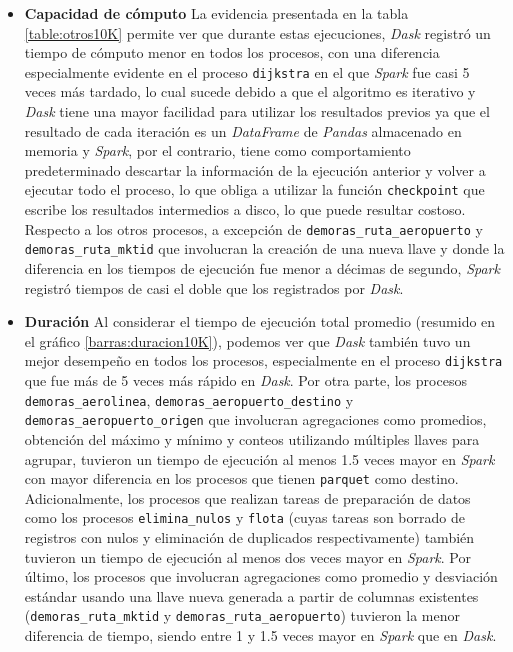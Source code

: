 \begin{itemize}
	\item \textbf{Capacidad de cómputo} La evidencia presentada en la tabla \ref{table:otros10K} permite ver que durante estas ejecuciones, \textit{Dask} registró un tiempo de  cómputo menor en todos los procesos, con una diferencia especialmente evidente en el proceso \texttt{dijkstra} en el que \textit{Spark} fue casi 5 veces más tardado, lo cual sucede debido a que el algoritmo es iterativo y \textit{Dask} tiene una mayor facilidad para utilizar los resultados previos ya que el resultado de cada iteración es un \textit{DataFrame} de \textit{Pandas} almacenado en memoria y \textit{Spark}, por el contrario, tiene como comportamiento predeterminado descartar la información de la ejecución anterior y volver a ejecutar todo el proceso, lo que obliga a utilizar la función \texttt{checkpoint} que escribe los resultados intermedios a disco, lo que puede resultar costoso. Respecto a los otros procesos, a excepción de \texttt{demoras\_ruta\_aeropuerto} y \texttt{demoras\_ruta\_mktid} que involucran la creación de una nueva llave y donde la diferencia en los tiempos de ejecución fue menor a décimas de segundo, \textit{Spark} registró tiempos de casi el doble que los registrados por \textit{Dask}.
	
	\item \textbf{Duración} Al considerar el tiempo de ejecución total promedio (resumido en el gráfico \ref{barras:duracion10K}), podemos ver que \textit{Dask} también tuvo un mejor desempeño en todos los procesos, especialmente en el proceso \texttt{dijkstra} que fue más de 5 veces más rápido en \textit{Dask}. Por otra parte, los procesos \texttt{demoras\_aerolinea}, \texttt{demoras\_aeropuerto\_destino} y \texttt{demoras\_aeropuerto\_origen} que involucran agregaciones como promedios, obtención del máximo y mínimo y conteos utilizando múltiples llaves para agrupar, tuvieron un tiempo de ejecución al menos 1.5 veces mayor en \textit{Spark} con mayor diferencia en los procesos que tienen \texttt{parquet} como destino. Adicionalmente, los procesos que realizan tareas de preparación de datos como los procesos \texttt{elimina\_nulos} y \texttt{flota} (cuyas tareas son borrado de registros con nulos y eliminación de duplicados respectivamente) también tuvieron un tiempo de ejecución al menos dos veces mayor en \textit{Spark}. Por último, los procesos que involucran agregaciones como promedio y desviación estándar usando una llave nueva generada a partir de columnas existentes (\texttt{demoras\_ruta\_mktid} y \texttt{demoras\_ruta\_aeropuerto}) tuvieron la menor diferencia de tiempo, siendo entre 1 y 1.5 veces mayor en \textit{Spark} que en \textit{Dask}.  
	
\end{itemize}


